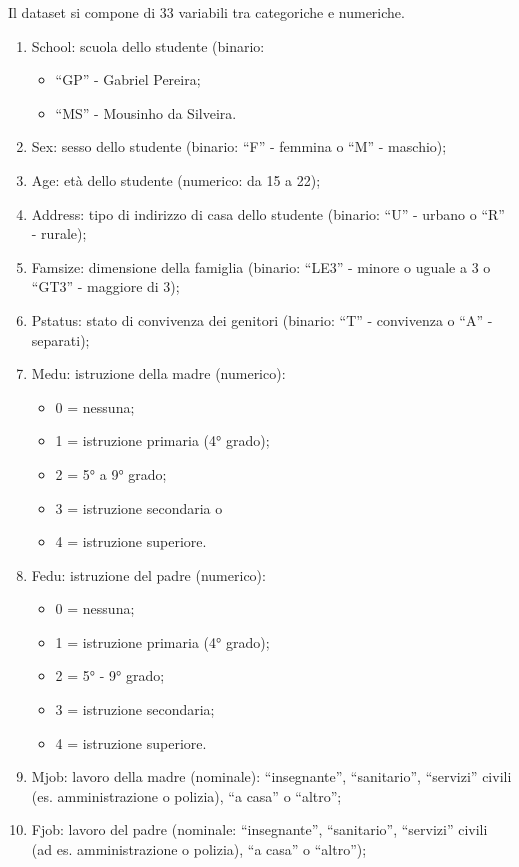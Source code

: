 \documentclass[12pt,a4paper]{report}
\begin{document}
\begin{multicols}{2}
	Il dataset si compone di 33 variabili tra categoriche e numeriche.
	\begin{enumerate}
		\item 	School: scuola dello studente (binario: 
		\begin{itemize}
			\item “GP” - Gabriel Pereira;
			\item “MS” - Mousinho da Silveira.
		\end{itemize}
		\item Sex: sesso dello studente (binario: “F” - femmina o “M” - maschio);
		\item Age: età dello studente (numerico: da 15 a 22);
		\item Address: tipo di indirizzo di casa dello studente (binario: “U” - urbano o “R” - rurale);
		\item Famsize: dimensione della famiglia (binario: “LE3” - minore o uguale a 3 o “GT3” - maggiore di 3);
		\item Pstatus: stato di convivenza dei genitori (binario: “T” - convivenza o “A” - separati);
		\item Medu: istruzione della madre (numerico):
		\begin{itemize}
			\item 		0 = nessuna;
			\item 1 = istruzione primaria (4° grado);
			\item 2 = 5° a 9° grado; 
			\item 3 = istruzione secondaria o 
			\item 4 = istruzione superiore.
		\end{itemize} 
		\item Fedu: istruzione del padre (numerico): 
		\begin{itemize}
			\item 0 = nessuna;
			\item 1 = istruzione primaria (4° grado); 
			\item 2 = 5° - 9° grado;
			\item 3 = istruzione secondaria;
			\item 4 = istruzione superiore.
		\end{itemize}
		\item Mjob: lavoro della madre (nominale): “insegnante”, “sanitario”, “servizi” civili (es. amministrazione o polizia), “a casa” o “altro”;
		\item Fjob: lavoro del padre (nominale: “insegnante”, “sanitario”, “servizi” civili (ad es. amministrazione o polizia), “a casa” o “altro”);

\end{enumerate}
\end{multicols}
\end{document}
